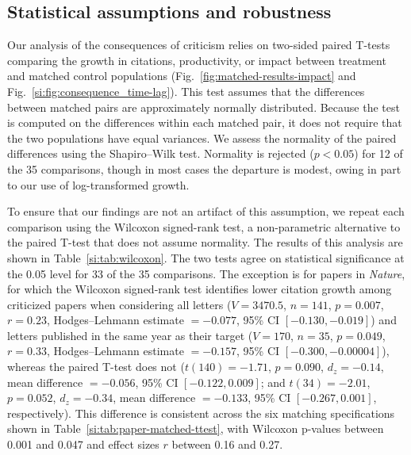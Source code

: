\documentclass[12pt]{article} %
\begin{document}
\subsection*{Statistical assumptions and robustness}
Our analysis of the consequences of criticism relies on two-sided paired T-tests comparing the growth in citations, productivity, or impact between treatment and matched control populations (Fig.~\ref*{fig:matched-results-impact} and Fig.~\ref{si:fig:consequence_time-lag}).
This test assumes that the differences between matched pairs are approximately normally distributed.
Because the test is computed on the differences within each matched pair, it does not require that the two populations have equal variances.
We assess the normality of the paired differences using the Shapiro–Wilk test.
Normality is rejected ($p < 0.05$) for 12 of the 35 comparisons, though in most cases the departure is modest, owing in part to our use of log-transformed growth.

To ensure that our findings are not an artifact of this assumption, we repeat each comparison using the Wilcoxon signed-rank test, a non-parametric alternative to the paired T-test that does not assume normality.
The results of this analysis are shown in Table~\ref{si:tab:wilcoxon}.
The two tests agree on statistical significance at the 0.05 level for 33 of the 35 comparisons.
The exception is for papers in \textit{Nature}, for which the Wilcoxon signed-rank test identifies lower citation growth among criticized papers when considering all letters ($V = 3470.5$, $n = 141$, $p = 0.007$, $r = 0.23$, Hodges--Lehmann estimate $= -0.077$, 95\% CI $[-0.130, -0.019]$) and letters published in the same year as their target ($V = 170$, $n = 35$, $p = 0.049$, $r = 0.33$, Hodges--Lehmann estimate $= -0.157$, 95\% CI $[-0.300, -0.00004]$), whereas the paired T-test does not ($t(140) = -1.71$, $p = 0.090$, $d_z = -0.14$, mean difference $= -0.056$, 95\% CI $[-0.122, 0.009]$; and $t(34) = -2.01$, $p = 0.052$, $d_z = -0.34$, mean difference $= -0.133$, 95\% CI $[-0.267, 0.001]$, respectively).
This difference is consistent across the six matching specifications shown in Table~\ref{si:tab:paper-matched-ttest}, with Wilcoxon p-values between 0.001 and 0.047 and effect sizes $r$ between 0.16 and 0.27.
\end{document}
